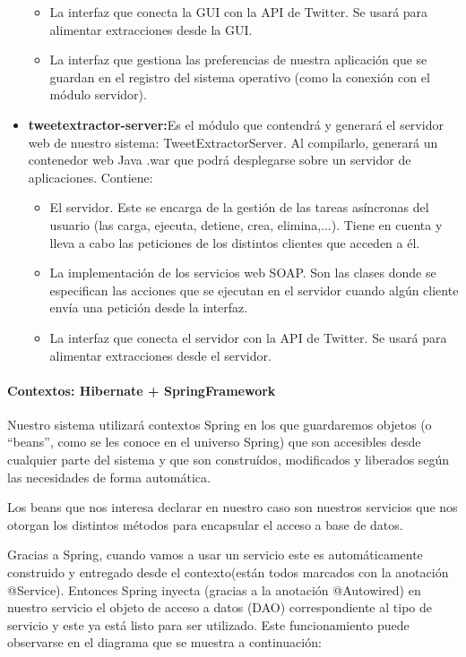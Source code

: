 \begin{itemize}
\begin{itemize}
	 	\item La interfaz que conecta la GUI con la API de Twitter. Se usará para alimentar extracciones desde la GUI.
	 	\item La interfaz que gestiona las preferencias de nuestra aplicación que se guardan en el registro del sistema operativo (como la conexión con el módulo servidor).
	 \end{itemize}
 	 \item \textbf{tweetextractor-server:}Es el módulo que contendrá y generará el servidor web de nuestro sistema: TweetExtractorServer. Al compilarlo, generará un contenedor web Java .war que podrá desplegarse sobre un servidor de aplicaciones. Contiene:
 	 \begin{itemize}
 	 	\item El servidor. Este se encarga de la gestión de las tareas asíncronas del usuario (las carga, ejecuta, detiene, crea, elimina,...). Tiene en cuenta y lleva a cabo las peticiones de los distintos clientes que acceden a él.
 	 	\item La implementación de los servicios web SOAP. Son las clases donde se especifican las acciones que se ejecutan en el servidor cuando algún cliente envía una petición desde la interfaz.
 	 	\item La interfaz que conecta el servidor con la API de Twitter. Se usará para alimentar extracciones desde el servidor.
 	 \end{itemize}
\end{itemize}

\paragraph{Contextos: Hibernate + SpringFramework}
Nuestro sistema utilizará contextos Spring en los que guardaremos objetos (o ``beans'', como se les conoce en el universo Spring) que son accesibles desde cualquier parte del sistema y que son construídos, modificados y liberados según las necesidades de forma automática. 

Los beans que nos interesa declarar en nuestro caso son nuestros servicios que nos otorgan los distintos métodos para encapsular el acceso a base de datos. 

Gracias a Spring, cuando vamos a usar un servicio este es automáticamente construido y entregado desde el contexto(están todos marcados con la anotación @Service). Entonces Spring inyecta (gracias a la anotación @Autowired) en nuestro servicio el objeto de acceso a datos (DAO) correspondiente al tipo de servicio y este ya está listo para ser utilizado. Este funcionamiento puede observarse en el diagrama que se muestra a continuación:

